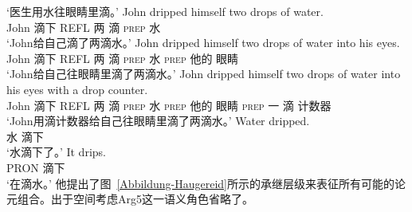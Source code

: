 \begin{exe}
\begin{xlist}[iv.]
\begin{exe}
\begin{xlist}[iv.]
\glt `医生用水往眼睛里滴。' 
\ex
\gll John dripped himself two drops of water.     \\
     John 滴下 REFL 两 滴 \textsc{prep} 水\\
\glt `John给自己滴了两滴水。' 
\ex
\gll John dripped himself two drops of water into his eyes. \\
     John 滴下 REFL 两 滴 \textsc{prep} 水 \textsc{prep} 他的 眼睛\\
\glt `John给自己往眼睛里滴了两滴水。' 
\ex
\gll John dripped himself two drops of water into his eyes with a drop counter. \\
     John 滴下 REFL 两 滴 \textsc{prep} 水 \textsc{prep} 他的 眼睛 \textsc{prep} 一 滴 计数器\\
\glt `John用滴计数器给自己往眼睛里滴了两滴水。' 
\ex
\gll Water dripped. \\
     水 滴下\\
\glt `水滴下了。' 
\ex
\gll It drips. \\
     PRON 滴下\\
\glt `在滴水。' 
\zl
他提出了图~\ref{Abbildung-Haugereid}所示的承继层级来表征所有可能的论元组合。出于空间考虑Arg5这一语义角色省略了。


\end{xlist}
\end{exe}
\end{xlist}
\end{exe}

